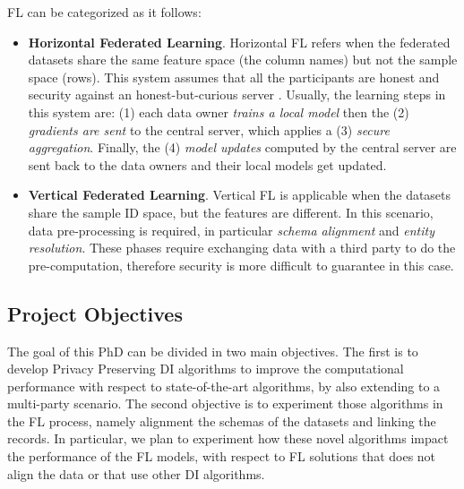 \documentclass[12pt]{article}
\begin{document}
FL can be categorized as it follows: 
\begin{itemize}
   \item \textbf{Horizontal Federated Learning}. Horizontal FL refers when the federated datasets share the same feature space (the column names) but not the sample space (rows). This system
   assumes that all the participants are honest and security against an honest-but-curious server \cite*{Yang2019}. Usually, the learning steps in this system are: (1) 
   each data owner \textit{trains a local model} then the (2) \textit{gradients are sent} to the central server, which applies a (3) \textit{secure aggregation}. 
   Finally, the (4) \textit{model updates} computed by the central server are sent back to the data owners and their local models get updated.
   \item \textbf{Vertical Federated Learning}. Vertical FL is applicable when the datasets share the sample ID space, but the features are different. In this scenario, data pre-processing is required, in particular 
   \textit{schema alignment} and \textit{entity resolution}. These phases require exchanging data with a third party to do the pre-computation, therefore security is more difficult to guarantee in this case.
\end{itemize}


\subsection{Project Objectives}
The goal of this PhD can be divided in two main objectives. The first is to develop Privacy Preserving DI algorithms to improve the computational 
performance with respect to state-of-the-art algorithms, by also extending to a multi-party scenario.
The second objective is to experiment those algorithms in the FL process, namely alignment the schemas of the datasets and linking the records. 
In particular, we plan to experiment how these novel algorithms impact the performance of the FL models, with respect to FL solutions that does not align the data or 
that use other DI algorithms. 
\end{document}
